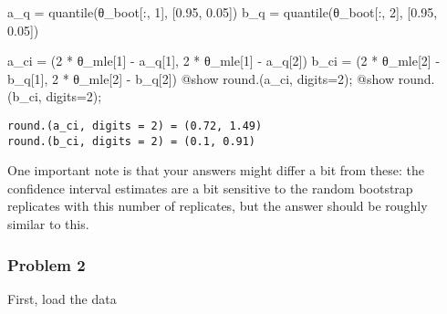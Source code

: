 \documentclass[
  letterpaper,
  DIV=11,
  numbers=noendperiod]{scrartcl}
\newenvironment{Shaded}{\begin{snugshade}}{\end{snugshade}}
\newcommand{\FloatTok}[1]{\textcolor[rgb]{0.68,0.00,0.00}{#1}}
\newcommand{\FunctionTok}[1]{\textcolor[rgb]{0.28,0.35,0.67}{#1}}
\newcommand{\NormalTok}[1]{\textcolor[rgb]{0.00,0.23,0.31}{#1}}
\newcommand{\OperatorTok}[1]{\textcolor[rgb]{0.37,0.37,0.37}{#1}}
\newcommand{\PreprocessorTok}[1]{\textcolor[rgb]{0.68,0.00,0.00}{#1}}
\begin{document}
\begin{Shaded}
\begin{Highlighting}[]
\NormalTok{a\_q }\OperatorTok{=} \FunctionTok{quantile}\NormalTok{(θ\_boot[}\OperatorTok{:}\NormalTok{, }\FloatTok{1}\NormalTok{], [}\FloatTok{0.95}\NormalTok{, }\FloatTok{0.05}\NormalTok{])}
\NormalTok{b\_q }\OperatorTok{=} \FunctionTok{quantile}\NormalTok{(θ\_boot[}\OperatorTok{:}\NormalTok{, }\FloatTok{2}\NormalTok{], [}\FloatTok{0.95}\NormalTok{, }\FloatTok{0.05}\NormalTok{])}

\NormalTok{a\_ci }\OperatorTok{=}\NormalTok{ (}\FloatTok{2} \OperatorTok{*}\NormalTok{ θ\_mle[}\FloatTok{1}\NormalTok{] }\OperatorTok{{-}}\NormalTok{ a\_q[}\FloatTok{1}\NormalTok{], }\FloatTok{2} \OperatorTok{*}\NormalTok{ θ\_mle[}\FloatTok{1}\NormalTok{] }\OperatorTok{{-}}\NormalTok{ a\_q[}\FloatTok{2}\NormalTok{]) }
\NormalTok{b\_ci }\OperatorTok{=}\NormalTok{ (}\FloatTok{2} \OperatorTok{*}\NormalTok{ θ\_mle[}\FloatTok{2}\NormalTok{] }\OperatorTok{{-}}\NormalTok{ b\_q[}\FloatTok{1}\NormalTok{], }\FloatTok{2} \OperatorTok{*}\NormalTok{ θ\_mle[}\FloatTok{2}\NormalTok{] }\OperatorTok{{-}}\NormalTok{ b\_q[}\FloatTok{2}\NormalTok{]) }
\PreprocessorTok{@show} \FunctionTok{round}\NormalTok{.(a\_ci, digits}\OperatorTok{=}\FloatTok{2}\NormalTok{);}
\PreprocessorTok{@show} \FunctionTok{round}\NormalTok{.(b\_ci, digits}\OperatorTok{=}\FloatTok{2}\NormalTok{);}
\end{Highlighting}
\end{Shaded}

\begin{verbatim}
round.(a_ci, digits = 2) = (0.72, 1.49)
round.(b_ci, digits = 2) = (0.1, 0.91)
\end{verbatim}

One important note is that your answers might differ a bit from these:
the confidence interval estimates are a bit sensitive to the random
bootstrap replicates with this number of replicates, but the answer
should be roughly similar to this.

\subsubsection{Problem 2}\label{problem-2}

First, load the data
\end{document}

